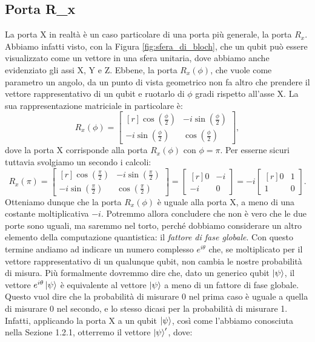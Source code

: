 \documentclass{book}
\theoremstyle{definition}
\theoremstyle{definition}
\theoremstyle{definition}
\theoremstyle{plain}
\theoremstyle{plain}
\theoremstyle{plain}
\theoremstyle{plain}
\begin{document}
\subsection{Porta R_{x}}
La porta X in realtà è un caso particolare di una porta più generale, la porta $R_{x}$. Abbiamo infatti visto, con la Figura \ref{fig:sfera_di_bloch}, che un qubit può essere visualizzato come un vettore in una sfera unitaria, dove abbiamo anche evidenziato gli assi X, Y e Z. Ebbene, la porta $R_x(\phi)$, che vuole come parametro un angolo, da un punto di vista geometrico non fa altro che prendere il vettore rappresentativo di un qubit e ruotarlo di $\phi$ gradi rispetto all'asse X. La sua rappresentazione matriciale in particolare è:
\begin{displaymath}
    R_x(\phi) = 
    \begin{bmatrix*}[r]
    \cos(\frac{\phi}{2}) & -i\sin(\frac{\phi}{2})\\
    -i\sin(\frac{\phi}{2}) & \cos(\frac{\phi}{2})
    \end{bmatrix*},
\end{displaymath}
dove la porta X corrisponde alla porta $R_x(\phi)$ con $\phi = \pi$. Per esserne sicuri tuttavia svolgiamo un secondo i calcoli:
\begin{displaymath}
    R_x(\pi) = 
    \begin{bmatrix*}[r]
    \cos(\frac{\pi}{2}) & -i\sin(\frac{\pi}{2})\\
    -i\sin(\frac{\pi}{2}) & \cos(\frac{\pi}{2})
    \end{bmatrix*} =
    \begin{bmatrix*}[r]
    0 & -i\\
    -i & 0
    \end{bmatrix*} = -i
    \begin{bmatrix*}[r]
    0 & 1\\
    1 & 0
    \end{bmatrix*} .
\end{displaymath}
Otteniamo dunque che la porta $R_x(\phi)$ è uguale alla porta X, a meno di una costante moltiplicativa $-i$. Potremmo allora concludere che non è vero che le due porte sono uguali, ma saremmo nel torto, perché dobbiamo considerare un altro elemento della computazione quantistica: il \emph{fattore di fase globale}. Con questo termine andiamo ad indicare un numero complesso $e^{i\theta}$ che, se moltiplicato per il vettore rappresentativo di un qualunque qubit, non cambia le nostre probabilità di misura. Più formalmente dovremmo dire che, dato un generico qubit $\ket{\psi}$, il vettore $e^{i\theta}\ket{\psi}$ è equivalente al vettore $\ket{\psi}$ a meno di un fattore di fase globale. Questo vuol dire che la probabilità di misurare 0 nel prima caso è uguale a quella di misurare 0 nel secondo, e lo stesso dicasi per la probabilità di misurare 1. Infatti, applicando la porta X a un qubit $\ket{\psi}$, così come l'abbiamo conosciuta nella Sezione 1.2.1, otterremo il vettore $\ket{\psi}'$, dove:
\end{document}
